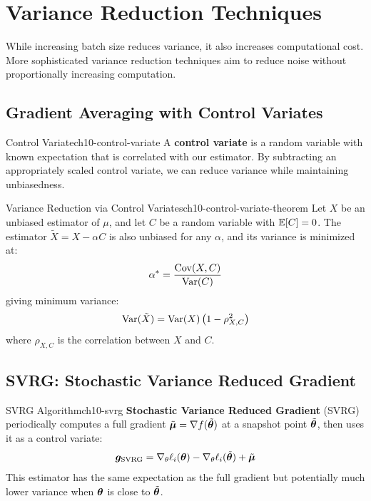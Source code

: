 \documentclass[../../main.tex]{subfiles}
\begin{document}
\section{Variance Reduction Techniques}
\label{sec:ch10-variance-reduction}

While increasing batch size reduces variance, it also increases computational cost. More sophisticated variance reduction techniques aim to reduce noise without proportionally increasing computation.

\subsection{Gradient Averaging with Control Variates}

\begin{definition}{Control Variate}{ch10-control-variate}
A \textbf{control variate} is a random variable with known expectation that is correlated with our estimator. By subtracting an appropriately scaled control variate, we can reduce variance while maintaining unbiasedness.
\end{definition}

\begin{theorem}{Variance Reduction via Control Variates}{ch10-control-variate-theorem}
Let $X$ be an unbiased estimator of $\mu$, and let $C$ be a random variable with $\operatorname{\mathbb{E}}[C] = 0$. The estimator $\tilde{X} = X - \alpha C$ is also unbiased for any $\alpha$, and its variance is minimized at:
\[
    \alpha^* = \frac{\operatorname{Cov}(X, C)}{\operatorname{Var}(C)}
\]
giving minimum variance:
\[
    \operatorname{Var}(\tilde{X}) = \operatorname{Var}(X)\left(1 - \rho^2_{X,C}\right)
\]
where $\rho_{X,C}$ is the correlation between $X$ and $C$.
\end{theorem}

\subsection{SVRG: Stochastic Variance Reduced Gradient}

\begin{definition}{SVRG Algorithm}{ch10-svrg}
\textbf{Stochastic Variance Reduced Gradient} (SVRG) periodically computes a full gradient $\tilde{\boldsymbol{\mu}} = \nabla f(\tilde{\boldsymbol{\theta}})$ at a snapshot point $\tilde{\boldsymbol{\theta}}$, then uses it as a control variate:
\[
    \boldsymbol{g}_{\text{SVRG}} = \nabla_\theta \ell_i(\boldsymbol{\theta}) - \nabla_\theta \ell_i(\tilde{\boldsymbol{\theta}}) + \tilde{\boldsymbol{\mu}}
\]
This estimator has the same expectation as the full gradient but potentially much lower variance when $\boldsymbol{\theta}$ is close to $\tilde{\boldsymbol{\theta}}$.
\end{definition}
\end{document}
